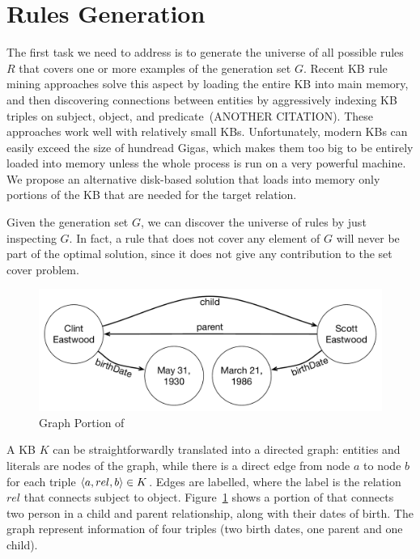 \section{Rules Generation}
The first task we need to address is to generate the universe of all possible rules $R$ that covers one or more examples of the generation set $G$.
Recent KB rule mining approaches solve this aspect by loading the entire KB into main memory, and then discovering connections between entities by aggressively indexing KB triples on subject, object, and predicate~\cite{galarraga2015fast}(ANOTHER CITATION). These approaches work well with relatively small KBs. Unfortunately, modern KBs can easily exceed the size of hundread Gigas, which makes them too big to be entirely loaded into memory unless the whole process is run on a very powerful machine. We propose an alternative disk-based solution that loads into memory only portions of the KB that are needed for the target relation.

Given the generation set $G$, we can discover the universe of rules by just inspecting $G$. In fact, a rule that does not cover any element of $G$ will never be part of the optimal solution, since it does not give any contribution to the set cover problem.

\begin{figure}[t]
	\centering
	\includegraphics[width=\columnwidth]{include/figure/graph_example.pdf}
	\caption{Graph Portion of \dbpedia}
	\label{fig:graph_example}
\end{figure}

A KB $K$ can be straightforwardly translated into a directed graph: entities and literals are nodes of the graph, while there is a direct edge from node $a$ to node $b$ for each triple $\langle a,rel,b\rangle \in K$. Edges are labelled, where the label is the relation $rel$ that connects subject to object. Figure~\ref{fig:graph_example} shows a portion of \dbpedia that connects two person in a child and parent relationship, along with their dates of birth. The graph represent information of four triples (two birth dates, one parent and one child).

